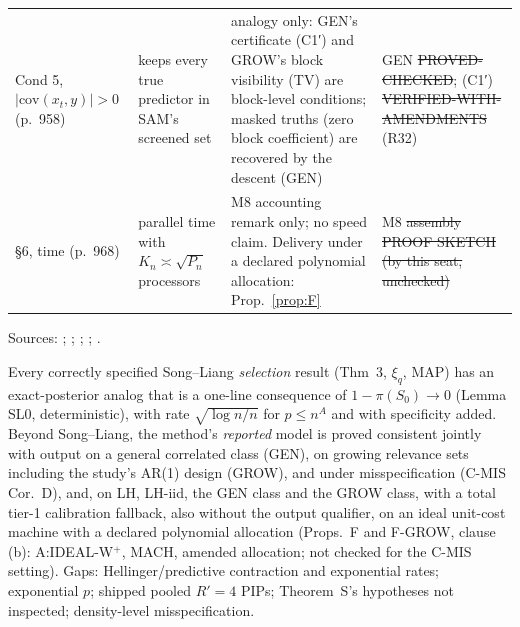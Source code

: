{\begin{xltabular}{\linewidth}{@{}p{2.4cm}p{3.5cm}Xp{3.4cm}@{}}
Cond 5, $|\mathrm{cov}(x_t,y)|>0$ (p.~958) & keeps every true predictor in SAM's screened set & analogy only: GEN's certificate (C1′) and GROW's block visibility (TV) are block-level conditions; masked truths (zero block coefficient) are recovered by the descent (GEN) & GEN \st{PROVED-CHECKED}; (C1′) \st{VERIFIED-WITH-AMENDMENTS} (R32) \\
§6, time (p.~968) & parallel time with $K_n\asymp\sqrt{P_n}$ processors & M8 accounting remark only; no speed claim. Delivery under a declared polynomial allocation: Prop.~\ref{prop:F} & M8 \st{assembly PROOF SKETCH (by this seat, unchecked)} \\
\bottomrule
\end{xltabular}
}
\noindent Sources: ; ; ; ; .

\begin{plain}
Every correctly specified Song--Liang \emph{selection} result (Thm~3, $\xi_q$, MAP) has an exact-posterior analog that is a one-line consequence of $1-\pi(S_0)\to0$ (Lemma SL0, deterministic), with rate $\sqrt{\log n/n}$ for $p\le n^A$ and with specificity added. Beyond Song--Liang, the method's \emph{reported} model is proved consistent jointly with output on a general correlated class (GEN), on growing relevance sets including the study's AR(1) design (GROW), and under misspecification (C-MIS Cor.~D), and, on LH, LH-iid, the GEN class and the GROW class, with a total tier-1 calibration fallback, also without the output qualifier, on an ideal unit-cost machine with a declared polynomial allocation (Props.~F and F-GROW, clause (b): A:IDEAL-W$^{+}$, MACH, amended allocation; not checked for the C-MIS setting). Gaps: Hellinger/predictive contraction and exponential rates; exponential $p$; shipped pooled $R'=4$ PIPs; Theorem~S's hypotheses not inspected; density-level misspecification.
\end{plain}
